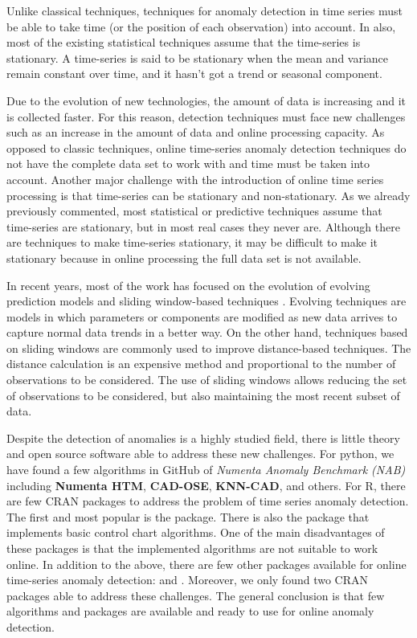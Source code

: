 \documentclass[a4paper]{article}
\begin{document}
Unlike classical techniques, techniques for anomaly detection in time series must be able to take time (or the position of each observation) into account. In also, most of the existing statistical techniques assume that the time-series is stationary. A time-series is said to be stationary when the mean and variance remain constant over time, and it hasn't got a trend or seasonal component.

Due to the evolution of new technologies, the amount of data is increasing and it is collected faster. For this reason, detection techniques must face new challenges such as an increase in the amount of data and online processing capacity. As opposed to classic techniques, online time-series anomaly detection techniques do not have the complete data set to work with and time must be taken into account. Another major challenge with the introduction of online time series processing is that time-series can be stationary and non-stationary. As we already previously commented,  most statistical or predictive techniques assume that time-series are stationary, but in most real cases they never are. Although there are techniques to make time-series stationary, it may be difficult to make it stationary because in online processing the full data set is not available.

In recent years, most of the work has focused on the evolution of evolving prediction models and sliding window-based techniques \cite{a3e0f1cf080343d98cae7430cd6e43c4}. Evolving techniques are models in which parameters or components are modified as new data arrives to capture normal data trends in a better way. On the other hand, techniques based on sliding windows are commonly used to improve distance-based techniques. The distance calculation is an expensive method and proportional to the number of observations to be considered. The use of sliding windows allows reducing the set of observations to be considered, but also maintaining the most recent subset of data.

Despite the detection of anomalies is a highly studied field, there is little theory and open source software able to address these new challenges. For python, we have found a few algorithms in GitHub of \emph{Numenta Anomaly Benchmark (NAB)} \cite{7424283} including \textbf{Numenta HTM}, \textbf{CAD-OSE}, \textbf{KNN-CAD}, and others. For R, there are few CRAN packages to address the problem of time series anomaly detection. The first and most popular is the  package. There is also the  package that implements basic control chart algorithms. One of the main disadvantages of these packages is that the implemented algorithms are not suitable to work online. In addition to the above, there are few other packages available for online time-series anomaly detection:  and . Moreover, we only found two CRAN packages able to address these challenges. The general conclusion is that few algorithms and packages are available and ready to use for online anomaly detection.
\end{document}
